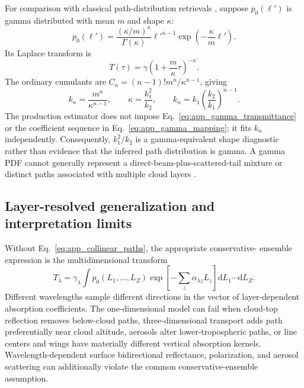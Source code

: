For comparison with classical path-distribution retrievals
\citep{funk2003,scholl2006}, suppose $p_0(\ell')$ is gamma distributed with mean
$m$ and shape $\kappa$:
\begin{equation}
  p_0(\ell')
  = \frac{(\kappa/m)^\kappa}{\Gamma(\kappa)}
    \ell'^{\kappa-1}
    \exp\left(-\frac{\kappa}{m}\ell'\right).
  \label{eq:app_gamma_pdf}
\end{equation}
Its Laplace transform is
\begin{equation}
  T(\tau)
  = \gamma\left(1+\frac{m}{\kappa}\tau\right)^{-\kappa}.
  \label{eq:app_gamma_transmittance}
\end{equation}
The ordinary cumulants are
$C_n=(n-1)!m^n/\kappa^{n-1}$, giving
\begin{equation}
  k_n=\frac{m^n}{\kappa^{n-1}},
  \qquad
  \kappa=\frac{k_1^2}{k_2},
  \qquad
  k_n=k_1\left(\frac{k_2}{k_1}\right)^{n-1}.
  \label{eq:app_gamma_mapping}
\end{equation}
The production estimator does not impose
Eq.~\eqref{eq:app_gamma_transmittance} or the coefficient sequence in
Eq.~\eqref{eq:app_gamma_mapping}; it fits $k_n$ independently.  Consequently,
$k_1^2/k_2$ is a gamma-equivalent shape diagnostic rather than evidence that
the inferred path distribution is gamma.  A gamma PDF cannot generally
represent a direct-beam-plus-scattered-tail mixture or distinct paths associated
with multiple cloud layers \citep{bennartz2006}.

\subsection{Layer-resolved generalization and interpretation limits}
\label{app:layered}

Without Eq.~\eqref{eq:app_collinear_paths}, the appropriate conservative-
ensemble expression is the multidimensional transform
\begin{equation}
  T_\lambda
  = \gamma_\lambda
    \int p_0(L_1,\ldots,L_Z)
    \exp\left[-\sum_z\alpha_{\lambda z}L_z\right]
    \mathrm{d}L_1\cdots\mathrm{d}L_Z.
  \label{eq:app_multidimensional}
\end{equation}
Different wavelengths sample different directions in the vector of
layer-dependent absorption coefficients.  The one-dimensional model can fail
when cloud-top reflection removes below-cloud paths, three-dimensional
transport adds path preferentially near cloud altitude, aerosols alter
lower-tropospheric paths, or line centers and wings have materially different
vertical absorption kernels.  Wavelength-dependent surface bidirectional
reflectance, polarization, and aerosol scattering can additionally violate the
common conservative-ensemble assumption.

